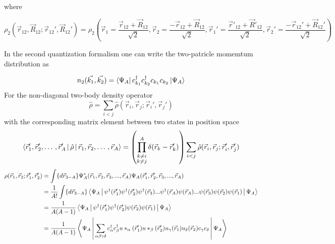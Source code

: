 \documentclass[12pt]{article}
\begin{document}
where 

\begin{equation} \label{eq:twobodydensity}
\rho_2(\vec{r}_{12},\vec{R}_{12}; \vec{r}_{12}',\vec{R}_{12}') = 
							\rho_2\left(	
							\vec{r}_1=\frac{\vec{r}_{12} + \vec{R}_{12}}{\sqrt{2}},
							\vec{r}_2=\frac{-\vec{r}_{12} + \vec{R}_{12}}{\sqrt{2}},
						    \vec{r}_1'=\frac{\vec{r}'_{12} + \vec{R}'_{12}}{\sqrt{2}},	
						    \vec{r}_2'=\frac{-\vec{r}_{12}' + \vec{R}_{12}'}{\sqrt{2}}
						    \right)
\end{equation}

In the second quantization formalism one can write the two-patricle momemtum distribution as

\begin{equation}
n_2(\vec{k_1},\vec{k_2})= \bra{\Psi_A} c^\dagger_{k_1} c^\dagger_{k_2} c_{k_1} c_{k_2} \ket{\Psi_A}
\end{equation}
For the non-diagonal two-body density operator
\begin{equation}
\hat{\rho} = \sum_{i<j} \hat{\rho}(\vec{r}_i, \vec{r}_j; \vec{r}_i', \vec{r}_j')
\end{equation}
with the corresponding matrix element between two states in position space
\begin{equation}
\Braket{\vec{r}'_1, \vec{r}'_2, \dotso, \vec{r}'_A|\hat{\rho}|\vec{r}_1, \vec{r}_2, \dotso, \vec{r}_A} = \left( \prod_{\substack{k\neq i  \\  k\neq j}}^{A} \delta(\vec{r}_k-\vec{r}_k') \right) \sum_{i<j} \hat{\rho}(\vec{r}_i, \vec{r}_j; \vec{r}_i', \vec{r}_j')
\end{equation}
\begin{align}
\rho(\vec{r}_1, \vec{r}_2; \vec{r}_1', \vec{r}_2') & =  \int \{d\vec{r}_{3-A}\} \Psi^*_A(\vec{r}_1,\vec{r}_2,\vec{r}_3, ... ,\vec{r}_A)\Psi_A(\vec{r}_1',\vec{r}_2',\vec{r}_3, ... ,\vec{r}_A) \\
& = \frac{1}{A!} \int \{d\vec{r}_{3-A}\} \Braket{\Psi_A | \psi^\dagger(\vec{r}'_1) \psi^\dagger(\vec{r}'_2)\psi^\dagger(\vec{r}_3) ...\psi^\dagger(\vec{r}_A) \psi(\vec{r}_A) ...\psi(\vec{r}_3)\psi(\vec{r}_2) \psi(\vec{r}_1)|\Psi_A } \\
& = \frac{1}{A(A-1)} \Braket{\Psi_A | \psi^\dagger(\vec{r}'_1) \psi^\dagger(\vec{r}'_2)\psi(\vec{r}_2) \psi(\vec{r}_1)|\Psi_A } \\
& = \frac{1}{A(A-1)} \Braket{\Psi_A | \sum_{\alpha\beta\gamma\delta} c^\dagger_\alpha c^\dagger_\beta u*_\alpha(\vec{r}_1') u*_\beta(\vec{r}_2') u_\gamma(\vec{r}_1) u_\delta(\vec{r}_2)c_\gamma c_\delta|\Psi_A } 
\end{align}
\end{document}
